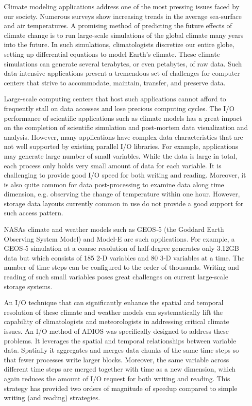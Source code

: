 Climate modeling applications address one of the most
pressing issues faced by our society. Numerous surveys show
increasing trends in the average sea-surface and air temperatures.
A promising method of predicting the future effects of climate
change is to run large-scale simulations of the global climate
many years into the future. In such simulations, climatologists
discretize our entire globe, setting up differential equations to model
Earth's climate. These climate simulations can
generate several terabytes, or even petabytes, of raw data.
Such data-intensive applications present a tremendous set of
challenges for computer centers that strive to accommodate,
maintain, transfer, and preserve data. 

Large-scale computing
centers that host such applications cannot afford to frequently
stall on data accesses and lose precious computing cycles.
The I/O performance of scientific applications such as climate
models has a great impact on the completion of scientific
simulation and post-mortem data visualization and analysis.
However, many applications have complex data characteristics
that are not well supported by existing parallel I/O libraries.
For example, applications may generate large number of small
variables. While the data is large in total, each process only holds very small
amount of data for each variable. It is challenging to provide
good I/O speed for both writing and reading. Moreover,
it is also quite common for data post-processing to examine
data along time dimension, e.g. observing the change of
temperature within one hour. However, storage data layouts currently common in use
do not provide a good support for such access pattern.

NASAs climate and weather models such as GEOS-5 (the
Goddard Earth Observing System Model) and Model-E are
such applications. For example, a GEOS-5 simulation at a coarse resolution of half-degree
generates only 3.12GB data but which consists of 185 2-D variables
and 80 3-D variables at a time. The number of time steps can be configured to the
order of thousands. Writing and reading of such small variables poses great
challenges  on current large-scale storage systems.  

An I/O technique that can
significantly enhance the spatial and temporal resolution of
these climate and weather models can systematically lift the
capability of climatologists and meteorologists in addressing
critical climate issues. An I/O method of ADIOS was specifically designed to address these problems. It leverages the spatial and temporal
relationships between variable data. Spatially it aggregates and merges data chunks of
the same time steps so that fewer processes write
larger blocks.
Moreover, the same variable across different time steps are merged together
with time as a new dimension, which again reduces the amount of I/O
request for both writing and reading. This strategy has provided two orders of magnitude of speedup compared to simple writing (and reading) strategies. 





